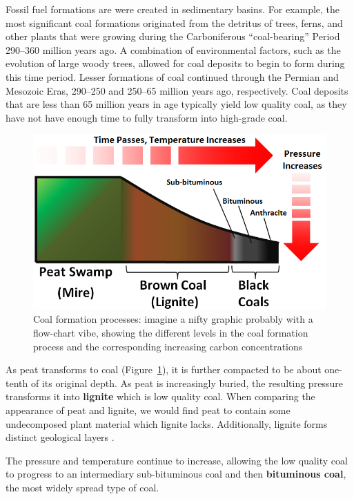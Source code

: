 Fossil fuel formations are were created in sedimentary basins. For example, the most significant coal formations originated from the detritus of trees, ferns, and other plants that were growing during the Carboniferous ``coal-bearing'' Period 290--360 million years ago. A combination of environmental factors, such as the evolution of large woody trees, allowed for coal deposits to begin to form during this time period. Lesser formations of coal continued through the Permian and Mesozoic Eras, 290--250 and 250--65 million years ago, respectively. Coal deposits that are less than 65 million years in age typically yield low quality coal, as they have not have enough time to fully transform into high-grade coal. 

\begin{figure}[htb]
	\centering
		\includegraphics[width=1.00\textwidth]{graphics/CoalFormation.png}
	\caption{Coal formation processes: imagine a nifty graphic probably with a flow-chart vibe, showing the different levels in the coal formation process and the corresponding increasing carbon concentrations}
	\label{fig:CoalFormation}
\end{figure}

As peat transforms to coal (Figure~\ref{fig:CoalFormation}), it is further compacted to be about one-tenth of its original depth. As peat is increasingly buried, the resulting pressure transforms it into \textbf{lignite} which is low quality coal. When comparing the appearance of peat and lignite, we would find peat to contain some undecomposed plant material which lignite lacks. Additionally, lignite forms distinct geological layers \citep{xie2015geological}.

The pressure and temperature continue to increase, allowing the low quality coal to progress to an intermediary sub-bituminous coal and then \textbf{bituminous coal}, the most widely spread type of coal.

